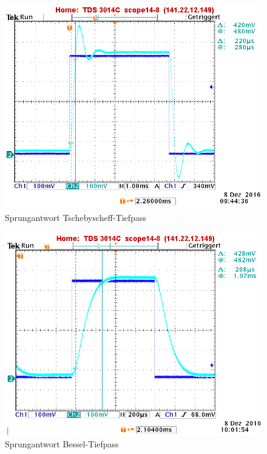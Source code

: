 \begin{figure}[h]
\centering
\includegraphics[width=0.7\linewidth]{Bilder/ImLabor/Sprungantwort_5_3_Tscheby_Anstiegszeit}
\caption{Sprungantwort Tschebyscheff-Tiefpass}
\label{fig:Sprungantwort_5_3_Tscheby_Anstiegszeit}
\end{figure}

\begin{figure}[h]
\centering
\includegraphics[width=0.7\linewidth]{Bilder/ImLabor/Sprungantwort_5_1_Bessel_Anstiegszeit}
\caption{Sprungantwort Bessel-Tiefpass}
\label{fig:Sprungantwort_5_1_Bessel_Anstiegszeit}
\end{figure}

\newpage